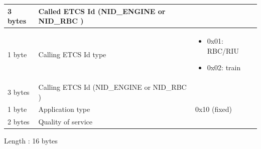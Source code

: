 \documentclass[nocc]{template/openetcs_report}
\begin{document}
\begin{longtable}{|l|l|l|}
				\hline
					 \begin{minipage}[t]{0.1\linewidth}3 bytes \end{minipage}
					&\begin{minipage}[t]{0.6\linewidth}Called ETCS Id (NID\_ENGINE or NID\_RBC )\end{minipage}
					&\begin{minipage}[t]{0.3\linewidth}\end{minipage} \\
					
				\hline
					 \begin{minipage}[t]{0.1\linewidth}1 byte \end{minipage}
					&\begin{minipage}[t]{0.6\linewidth}Calling ETCS Id type	\end{minipage}
					&\begin{minipage}[t]{0.3\linewidth}
						\begin{itemize}
							\item 0x01: RBC/RIU
							\item 0x02: train
						\end{itemize}
					\end{minipage} \\
					
				\hline
					 \begin{minipage}[t]{0.1\linewidth}3 bytes \end{minipage}
					&\begin{minipage}[t]{0.6\linewidth}Calling ETCS Id (NID\_ENGINE or NID\_RBC )	\end{minipage}
					&\begin{minipage}[t]{0.3\linewidth}\end{minipage} \\
					
				\hline
					 \begin{minipage}[t]{0.1\linewidth}1 byte \end{minipage}
					&\begin{minipage}[t]{0.6\linewidth}Application type \end{minipage}
					&\begin{minipage}[t]{0.3\linewidth}0x10 (fixed) \end{minipage} \\
					
				\hline
					 \begin{minipage}[t]{0.1\linewidth}2 bytes \end{minipage}
					&\begin{minipage}[t]{0.6\linewidth}Quality of service\end{minipage}
					&\begin{minipage}[t]{0.3\linewidth}\end{minipage} \\
				
				\hline
			\end{longtable}
			Length : 16 bytes
\end{document}

